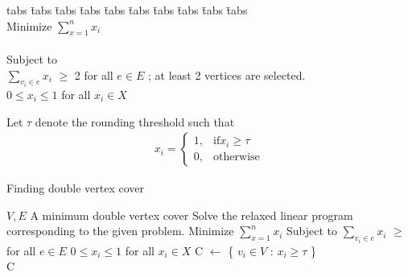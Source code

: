 \begin{tabbing}
  \label{relaxed_lp}
	tabs \= tabs \= tabs \= tabs \= tabs \= tabs \= tabs \= tabs \= tabs \= tabs \kill \\ 
	\> \> Minimize \>\>\>\>\>$\sum\limits_{x=1}^n x_i$  \\ \\
	\> \> Subject to \\
	\> \> \> \> $\sum\limits_{v_{i} \in e} x_i$ $\geq$ 2 \> \> \> for all $e \in E$ ; at least 2 vertices are selected.\\
	\> \> \> \> $ 0 \leq x_i \leq 1 $ \> \> \> for all $x_i \in X$ \\
\end{tabbing}

Let $\tau$ denote the rounding threshold such that
\begin{align*}
    x_i = \begin{cases}
        1, & \text{if} x_i \geq \tau \\
        0, & \text{otherwise}
    \end{cases}
\end{align*}

\begin{algorithm}
  \caption{Finding double vertex cover}
  \label{alg:double_vertex_cover}
  \begin{algorithmic}
    \renewcommand{\algorithmicrequire}{\textbf{Input:}}
    \renewcommand{\algorithmicensure}{\textbf{Output:}}
    \algnewcommand{}
    \algnewcommand\Operation{\item[\algorithmicoperation]}
    \Require $V,E$
    \Ensure A minimum double vertex cover
    \Operation
    \State Solve the relaxed linear program corresponding to the given problem.
    \State \hspace{\algorithmicindent}  Minimize \hspace{\algorithmicindent} $\sum\limits_{x=1}^n x_i$
    \State \hspace{\algorithmicindent}  Subject to
    \State \hspace{\algorithmicindent}  \hspace{\algorithmicindent} $\sum\limits_{v_{i} \in e} x_i$ $\geq$ for all $e \in E$
    \State \hspace{\algorithmicindent}  \hspace{\algorithmicindent} $ 0 \leq x_i \leq 1 $ for all $x_i \in X$
    \State C $\leftarrow$ \{ $v_i \in V$ : $x_i \geq \tau$ \} \\
    \Return C
  \end{algorithmic}
\end{algorithm}

